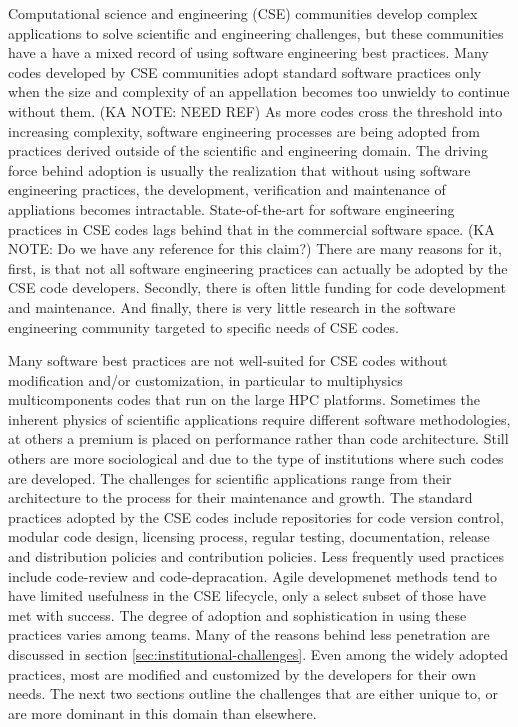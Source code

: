 \label{sec:introduction}
Computational science and engineering (CSE) communities develop complex applications to solve scientific and engineering challenges, but these communities have a have a mixed record of using software engineering best
practices. Many codes developed by CSE communities adopt standard software practices only when the size and complexity of an appellation becomes too unwieldy to continue without them.  (KA NOTE: NEED REF) 
As more codes cross the threshold into increasing complexity, software engineering processes are being adopted from practices derived outside of the scientific and engineering domain.  The driving force behind adoption is usually the realization
that without using software engineering practices, the development,
verification and maintenance of appliations becomes
intractable. State-of-the-art for software engineering
practices in CSE codes lags behind that in the commercial software
space. (KA NOTE: Do we have any reference for this claim?) There are many reasons for it, first, is that
not all software engineering practices can actually be adopted by the CSE code
developers.  Secondly, there is often little funding for code development and maintenance. And finally, there is very little research in the software
engineering community targeted to specific needs of CSE codes.

Many software best practices are not well-suited for CSE codes without
modification and/or customization, in particular to multiphysics
multicomponents codes that run on the large HPC platforms. Sometimes
the inherent physics of scientific applications require different
software methodologies, at others a premium is placed on
performance rather than code architecture.  Still others are more
sociological and due to the type of institutions where such codes are
developed. The challenges for scientific applications range
from their architecture to the process for their maintenance and
growth. The standard practices adopted by the CSE codes include
repositories for code version control, modular code design, licensing
process, regular testing, documentation, release and distribution
policies and contribution policies. Less frequently used practices
include code-review and code-depracation. Agile developmenet methods
tend to have limited usefulness in the CSE lifecycle, only a
select subset of those have met with success. The degree of adoption and
sophistication in using these  practices varies among teams. Many of
the reasons behind less penetration are discussed in section
\ref{sec:institutional-challenges}. Even among the widely adopted
practices, most are modified and customized by the developers for
their own needs. The next two sections outline the  challenges that
are either unique to, or are more dominant in this domain than
elsewhere.  


